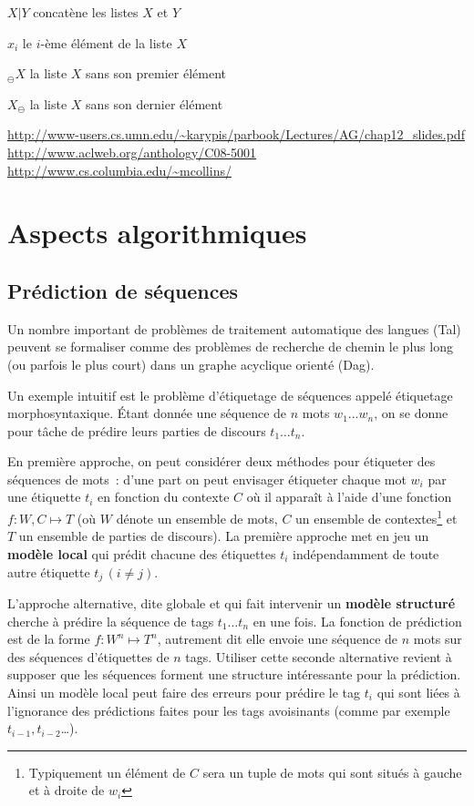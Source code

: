 \documentclass[11pt,openany]{book}
\newcommand{\ac}[1]{{\sc #1}} %
\begin{document}
\begin{description}
\item $X|Y$ concatène les listes $X$ et $Y$
\item $x_i$ le $i$-ème élément de la liste $X$
\item $_{\ominus}X$ la liste $X$ sans son premier élément
\item $X_{\ominus}$ la liste $X$ sans son dernier élément
\end{description}
 

\url{http://www-users.cs.umn.edu/~karypis/parbook/Lectures/AG/chap12_slides.pdf}
\url{http://www.aclweb.org/anthology/C08-5001}
\url{http://www.cs.columbia.edu/~mcollins/}






\chapter{Aspects algorithmiques}

\section{Prédiction de séquences}
Un nombre important de problèmes de traitement automatique des langues (\ac{Tal}) peuvent se formaliser comme des problèmes de recherche de chemin le plus long (ou parfois le plus court) dans un graphe acyclique orienté (\ac{Dag}).

Un exemple intuitif est le problème d'étiquetage de séquences appelé étiquetage morphosyntaxique. \'{E}tant donnée une séquence de $n$ mots $w_1\ldots w_n$,  on se donne pour tâche de prédire leurs parties de discours $t_1\ldots t_n$. 

En première approche, on peut considérer deux méthodes pour  étiqueter des séquences de mots~: d'une part on peut envisager étiqueter chaque mot $w_i$ par une étiquette $t_i$ en fonction du contexte $C$ où il apparaît à l'aide d'une fonction $f: W, C \mapsto T$ (où $W$ dénote un ensemble de mots, $C$ un ensemble de contextes\footnote{Typiquement un élément de $C$ sera un tuple de mots qui sont situés à gauche et à droite de $w_i$} et $T$ un ensemble de parties de discours). La première approche met en jeu  un {\bf modèle local} qui prédit  chacune des étiquettes $t_i$ indépendamment de toute autre étiquette $t_j\, (i\not = j)$.

L'approche alternative, dite globale et qui fait intervenir un {\bf modèle structuré} cherche à prédire la séquence de tags $t_1\ldots t_n$ en une fois.  La fonction de prédiction est de la forme $f:W^n \mapsto T^n$, autrement dit elle envoie une séquence de $n$ mots sur des séquences d'étiquettes de $n$ tags.  Utiliser cette seconde alternative  revient à supposer que les séquences forment une structure intéressante pour la prédiction. Ainsi un modèle local
peut faire des erreurs pour prédire le tag $t_i$ qui sont liées à l'ignorance des prédictions 
faites pour les tags avoisinants (comme par exemple $t_{i-1},t_{i-2}$\ldots). 
\end{document}

